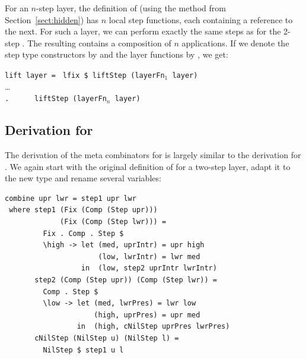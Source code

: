 \documentclass[preprint,natbib]{sigplanconf}
\begin{document}

For an $n$-step layer, the definition of  (using the method from Section~\ref{sect:hidden}) has $n$ local step functions, each  containing a reference to the next. \bc {} \ec For such a layer, we can perform exactly the same steps as for the 2-step . The resulting  contains a composition of $n$  applications. If we denote the step type constructors by  and the layer functions by , we get:

\begin{small}
\begin{tabbing}
{\tt lift layer = } \= {\tt lfix \$ liftStep (layerFn$_1$ layer)} \\
                    \>       \dots \\
                    \> {\tt .~~~~~~liftStep (layerFn$_n$ layer)}\\
\end{tabbing}%
\end{small}



%																
\subsection{Derivation for } \label{subsubsectcombine}


The derivation of the meta combinators for  is largely similar to the derivation for . We again start with the original definition of  for a two-step layer, adapt it to the new  type and rename several variables:

\begin{small} %
\begin{verbatim}
combine upr lwr = step1 upr lwr
 where step1 (Fix (Comp (Step upr))) 
             (Fix (Comp (Step lwr))) = 
         Fix . Comp . Step $ 
         \high -> let (med, uprIntr) = upr high
                      (low, lwrIntr) = lwr med
                  in  (low, step2 uprIntr lwrIntr)
       step2 (Comp (Step upr)) (Comp (Step lwr)) = 
         Comp . Step $
         \low -> let (med, lwrPres) = lwr low
                     (high, uprPres) = upr med
                 in  (high, cNilStep uprPres lwrPres)
       cNilStep (NilStep u) (NilStep l) = 
         NilStep $ step1 u l 
\end{verbatim}%
\end{small}
\end{document}
